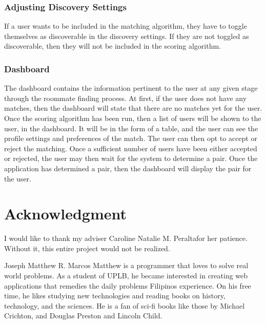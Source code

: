 \documentclass[journal]{IEEEtran}
\newcommand{\ADVISEE}{Joseph Matthew R. Marcos}
\newcommand{\ADVISER}{Caroline Natalie M. Peralta}
\begin{document}
        \subsubsection{Adjusting Discovery Settings}
        If a user wants to be included in the matching algorithm, they have to toggle themselves as discoverable in the
        discovery settings. If they are not toggled as discoverable, then they will not be included in the scoring
        algorithm.

        \subsubsection{Dashboard}
        The dashboard contains the information pertinent to the user at any given stage through the roommate finding
        process. At first, if the user does not have any matches, then the dashboard will state that there are no
        matches yet for the user. Once the scoring algorithm has been run, then a list of users will be shown to the
        user, in the dashboard. It will be in the form of a table, and the user can see the profile settings and
        preferences of the match. The user can then opt to accept or reject the matching. Once a sufficient number of
        users have been either accepted or rejected, the user may then wait for the system to determine a pair. Once the
        application has determined a pair, then the dashboard will display the pair for the user.

\newpage
\section*{Acknowledgment}
I would like to thank my adviser \ADVISER for her patience. Without it, this entire project would not be realized.
\begin{biography}{\ADVISEE}
    Matthew is a programmer that loves to solve real world problems. As a student of UPLB, he became interested in creating
    web applications that remedies the daily problems Filipinos experience. On his free time, he likes studying new
    technologies and reading books on history, technology, and the sciences. He is a fan of sci-fi books like those by
    Michael Crichton, and Douglas Preston and Lincoln Child.
\end{biography}
\end{document}
